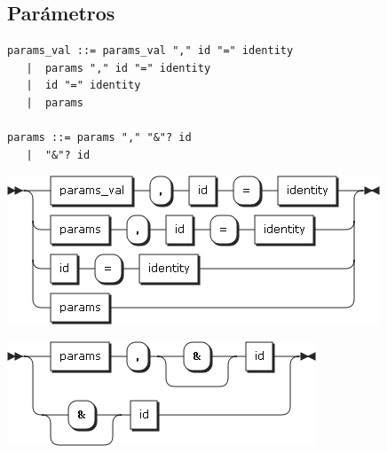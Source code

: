 \subsection{Parámetros}
\begin{lstlisting}[style=nonumbers]
params_val ::= params_val "," id "=" identity 
   |  params "," id "=" identity 
   |  id "=" identity 
   |  params
   
params ::= params "," "&"? id
   |  "&"? id
\end{lstlisting}
\begin{multicols}{2}
\begin{center}
\includegraphics[scale=0.4]{diagram/params_val.png} \\
\end{center}
\columnbreak
\begin{center}
\includegraphics[scale=0.4]{diagram/params.png} \\
\end{center}
\end{multicols}

